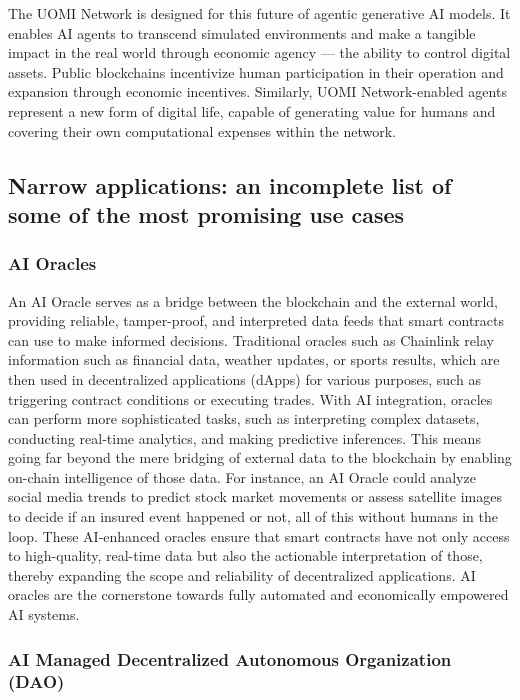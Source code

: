 \documentclass{article}
\begin{document}
The UOMI Network is designed for this future of agentic generative AI models. It enables AI agents to transcend simulated environments and make a tangible impact in the real world through economic agency — the ability to control digital assets. Public blockchains incentivize human participation in their operation and expansion through economic incentives. Similarly, UOMI Network-enabled agents represent a new form of digital life, capable of generating value for humans and covering their own computational expenses within the network.

\subsection{Narrow applications: an incomplete list of some of the most promising use cases
}

\subsubsection{AI Oracles}

An AI Oracle serves as a bridge between the blockchain and the external world, providing reliable, tamper-proof, and interpreted data feeds that smart contracts can use to make informed decisions. Traditional oracles such as Chainlink relay information such as financial data, weather updates, or sports results, which are then used in decentralized applications (dApps) for various purposes, such as triggering contract conditions or executing trades. With AI integration, oracles can perform more sophisticated tasks, such as interpreting complex datasets, conducting real-time analytics, and making predictive inferences. This means going far beyond the mere bridging of external data to the blockchain by enabling on-chain intelligence of those data. For instance, an AI Oracle could analyze social media trends to predict stock market movements or assess satellite images to decide if an insured event happened or not, all of this without humans in the loop. These AI-enhanced oracles ensure that smart contracts have not only access to high-quality, real-time data but also the actionable interpretation of those, thereby expanding the scope and reliability of decentralized applications. AI oracles are the cornerstone towards fully automated and economically empowered AI systems.


\subsubsection{AI Managed Decentralized Autonomous Organization (DAO) }
\end{document}
